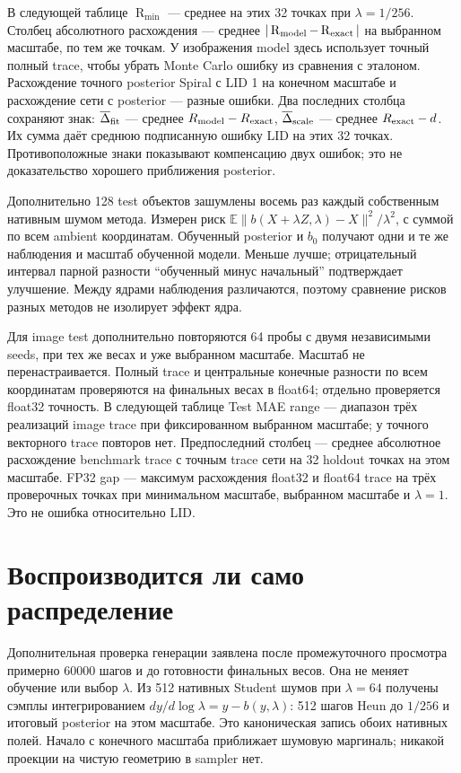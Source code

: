 \documentclass[10pt,a4paper]{article}
\newcommand{\R}{\operatorname{R}}
\begin{document}
В следующей таблице $\R_{\min}$ --- среднее на этих 32 точках при
$\lambda=1/256$. Столбец абсолютного расхождения --- среднее
$|\R_{\rm model}-\R_{\rm exact}|$ на выбранном масштабе, по тем же точкам.
У изображения model здесь использует точный полный trace, чтобы убрать
Monte Carlo ошибку из сравнения с эталоном. Расхождение точного posterior
Spiral с LID 1 на конечном масштабе и расхождение сети с posterior --- разные ошибки.
Два последних столбца сохраняют знак: $\overline\Delta_{\rm fit}$ --- среднее
$R_{\rm model}-R_{\rm exact}$, $\overline\Delta_{\rm scale}$ --- среднее
$R_{\rm exact}-d$. Их сумма даёт среднюю подписанную ошибку LID на этих
32 точках. Противоположные знаки показывают компенсацию двух ошибок;
это не доказательство хорошего приближения posterior.


Дополнительно 128 test объектов зашумлены восемь раз каждый собственным
нативным шумом метода. Измерен риск
$\mathbb{E}\|b(X+\lambda Z,\lambda)-X\|^2/\lambda^2$, с суммой по всем ambient
координатам. Обученный posterior и $b_0$ получают одни и те же наблюдения и
масштаб обученной модели. Меньше лучше; отрицательный интервал парной разности
``обученный минус начальный'' подтверждает улучшение. Между ядрами наблюдения
различаются, поэтому сравнение рисков разных методов не изолирует эффект ядра.


Для image test дополнительно повторяются 64 пробы с двумя независимыми seeds,
при тех же весах и уже выбранном масштабе. Масштаб не перенастраивается.
Полный trace и центральные конечные разности по всем координатам проверяются
на финальных весах в float64; отдельно проверяется float32 точность.
В следующей таблице Test MAE range --- диапазон трёх реализаций image trace
при фиксированном выбранном масштабе; у точного векторного trace повторов нет.
Предпоследний столбец --- среднее абсолютное расхождение benchmark trace с
точным trace сети на 32 holdout точках на этом масштабе. FP32 gap --- максимум
расхождения float32 и float64 trace на трёх проверочных точках при минимальном
масштабе, выбранном масштабе и $\lambda=1$. Это не ошибка относительно LID.


\section*{Воспроизводится ли само распределение}
Дополнительная проверка генерации заявлена после промежуточного просмотра
примерно 60000 шагов и до готовности финальных весов. Она не меняет обучение
или выбор $\lambda$. Из 512 нативных Student шумов при $\lambda=64$ получены
сэмплы интегрированием $dy/d\log\lambda=y-b(y,\lambda)$: 512 шагов Heun до
$1/256$ и итоговый posterior на этом масштабе. Это каноническая запись обоих
нативных полей. Начало с конечного масштаба приближает шумовую маргиналь;
никакой проекции на чистую геометрию в sampler нет.
\end{document}
